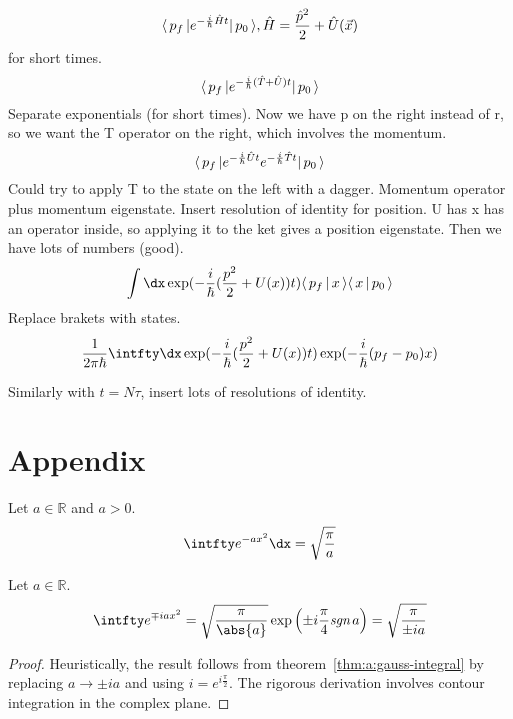 \documentclass[a4paper]{extarticle}
\newcommand{\ihbar}{\frac{i}{\hbar}}
\begin{document}
\begin{equation}
  \bra{p_f} e^{-\ihbar \hat{H} t} \ket{p_0},
  \hat{H} = \frac{\hat{p}^2}{2} + \hat{U}(\vec{x})
\end{equation}
for short times.
\begin{equation}
  \bra{p_f} e^{-\ihbar (\hat{T} + \hat{U}) t} \ket{p_0}
\end{equation}
Separate exponentials (for short times).
Now we have p on the right instead of r, so we want the T operator on the right,
which involves the momentum.
\begin{equation}
  \bra{p_f} e^{-\ihbar \hat{U} t} e^{-\ihbar \hat{T} t} \ket{p_0}
\end{equation}
Could try to apply T to the state on the left with a dagger.
Momentum operator plus momentum eigenstate.
Insert resolution of identity for position.
U has x has an operator inside, so applying it to the ket gives a position eigenstate.
Then we have lots of numbers (good).
\begin{equation}
  \int \dx \exp(-\ihbar ( \frac{p^2}{2} + U(x)) t) \braket{p_f}{x} \braket{x}{p_0}
\end{equation}
Replace brakets with states.
\begin{equation}
  \frac{1}{2\pi\hbar} \intfty\dx
  \exp(-\ihbar ( \frac{p^2}{2} + U(x)) t) \exp(-\frac{i}{\hbar} (p_f - p_0) x)
\end{equation}

Similarly with $t = N\tau$, insert lots of resolutions of identity.


\section*{Appendix}

\begin{thm}
  \label{thm:a:gauss-integral}
  Let $a \in \mathbb{R}$ and $a > 0$.
  \begin{equation}
    \label{eqn:a:gauss-integral}
    \intfty e^{-ax^2} \dx = \sqrt{\frac{\pi}{a}}
  \end{equation}
\end{thm}

\begin{thm}
  \label{thm:a:fresnel-integral}
  Let $a \in \mathbb{R}$.
  \begin{equation}
    \label{eqn:a:fresnel-integral}
    \intfty e^{\mp iax^2}
    = \sqrt{\frac{\pi}{\abs{a}}} \exp\left(\pm i\frac{\pi}{4} \emph{sgn}\,a\right)
    = \sqrt{\frac{\pi}{\pm ia}}
  \end{equation}
  \begin{proof}
    Heuristically, the result follows from theorem~\ref{thm:a:gauss-integral} by
    replacing $a \to \pm ia$ and using $i = e^{i\frac{\pi}{2}}$.
    The rigorous derivation involves contour integration in the complex plane.
  \end{proof}
\end{thm}
\end{document}
